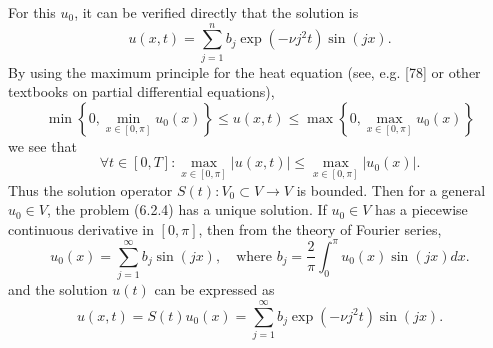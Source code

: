 \begin{frame}
	\frametitle{\insertsection}

	For this $u_{0}$, it can be verified directly that the solution is
	\begin{equation*}
		u\left(x,t\right)=
		\sum_{j=1}^{n}
		b_{j}\exp\left(-\nu j^{2}t\right)
		\sin\left(jx\right).
	\end{equation*}
	By using the maximum principle for the heat equation (see, e.g. [78] or
	other textbooks on partial differential equations),
	\begin{equation*}
		\min\left\{0,\min_{x\in\left[0,\pi\right]}u_{0}\left(x\right)\right\}\leq
		u\left(x,t\right)\leq
		\max\left\{0,\max_{x\in\left[0,\pi\right]}u_{0}\left(x\right)\right\}
	\end{equation*}
	we see that
	\begin{equation*}
		\forall t\in\left[0,T\right]:
		\max_{x\in\left[0,\pi\right]}
		\left|u\left(x,t\right)\right|\leq
		\max_{x\in\left[0,\pi\right]}
		\left|u_{0}\left(x\right)\right|.
	\end{equation*}
	Thus the solution operator $S\left(t\right)\colon V_{0}\subset V\to V$ is bounded.
	Then for a general $u_{0}\in V$, the problem (6.2.4) has a unique solution.
	If $u_{0}\in V$ has a piecewise continuous derivative in $\left[0,\pi\right]$,
	then from the theory of Fourier series,
	\begin{equation*}
		u_{0}\left(x\right)=
		\sum_{j=1}^{\infty}
		b_{j}\sin\left(jx\right),
		\quad\text{where }b_{j}=\frac{2}{\pi}\int_{0}^{\pi}u_{0}\left(x\right)\sin\left(jx\right)dx.
	\end{equation*}
	and the solution $u\left(t\right)$ can be expressed as
	\begin{equation*}
		u\left(x,t\right)=
		S\left(t\right)u_{0}\left(x\right)=
		\sum_{j=1}^{\infty}
		b_{j}\exp\left(-\nu j^{2}t\right)\sin\left(jx\right).
	\end{equation*}
\end{frame}


